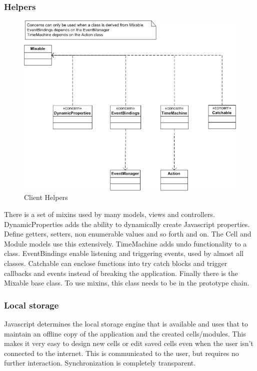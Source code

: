 \documentclass{report}
\begin{document}
				\subsubsection{Helpers}
					\begin{figure}[htb]
						\begin{center}
							\includegraphics[width=\linewidth]{helpers.png}
							\caption{Client Helpers}
							\label{fig: cmodels}
						\end{center}
					\end{figure}	
					There is a set of mixins used by many models, views and controllers. DynamicProperties adds the ability to dynamically create Javascript properties. Define getters, setters, non enumerable values and so forth and on. The Cell and Module models use this extensively. TimeMachine adds undo functionality to a class. EventBindings enable listening and triggering events, used by almost all classes. Catchable can enclose functions into try catch blocks and trigger callbacks and events instead of breaking the application. Finally there is the Mixable base class. To use mixins, this class needs to be in the prototype chain.
					
				\subsubsection{Local storage}
					Javascript determines the local storage engine that is available and uses that to maintain an offline copy of the application and the created cells/modules. This makes it very easy to design new cells or edit saved cells even when the user isn't connected to the internet. This is communicated to the user, but requires no further interaction. Synchronization is completely transparent.
		
\end{document}
